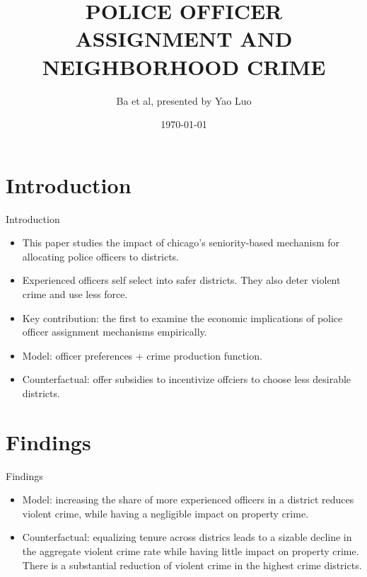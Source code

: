\documentclass[dvipsnames,mathserif]{beamer}
\begin{document}
\rightskip\rightmargin
\title{POLICE OFFICER ASSIGNMENT AND NEIGHBORHOOD CRIME}
\author{Ba et al, presented by Yao Luo}


\footnotesize{\date{\today }


\begin{frame}
\maketitle
\end{frame}


%
\footnotesize \tableofcontents
%
\section{Introduction}
\begin{frame}{Introduction}
    \begin{itemize}
    	\item This paper studies the impact of chicago's seniority-based mechanism for allocating police officers to districts.\\
    	\vspace{0.2cm}
    	\item Experienced officers self select into safer districts. They also deter violent crime and use less force.\\
    	\vspace{0.2cm}
    	\item Key contribution: the first to examine the economic implications of police officer assignment mechanisms empirically.\\
    	\vspace{0.2cm}
    	\item Model: officer preferences + crime production function.\\
    	\vspace{0.2cm}
    	\item Counterfactual: offer subsidies to incentivize offciers to choose less desirable districts.
        
    \end{itemize}
\end{frame}

\section{Findings}
\begin{frame}{Findings}
    \begin{itemize}
    	\item Model: increasing the share of more experienced officers in a district reduces violent crime, while having a negligible impact on property crime.\\
    	\vspace{0.5cm}
    	\item Counterfactual: equalizing tenure across districs leads to a sizable decline in the aggregate violent crime rate while having little impact on property crime. There is a substantial reduction of violent crime in the highest crime districts.\\
        

\end{itemize}
\end{frame}}
\end{document}
